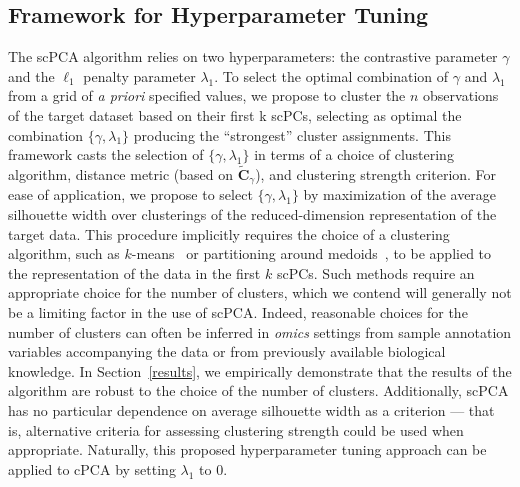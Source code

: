 \subsection{Framework for Hyperparameter Tuning}\label{hyp_tune}

The scPCA algorithm relies on two hyperparameters: the contrastive parameter $\gamma$ and the $\ell_1$ penalty parameter $\lambda_1$. To select the optimal combination of $\gamma$ and $\lambda_1$ from a grid of \textit{a priori} specified values, we propose to cluster the $n$ observations of the target dataset based on their first k scPCs, selecting as optimal the combination $\{\gamma, \lambda_1\}$ producing the ``strongest'' cluster assignments. This framework casts the selection of $\{\gamma, \lambda_1\}$ in terms of a choice of clustering algorithm, distance metric (based on $\widetilde{\mathbf{C}}_{\gamma}$), and clustering strength criterion. For ease of application, we propose to select $\{\gamma, \lambda_1\}$ by maximization of the average silhouette width over clusterings of the reduced-dimension representation of the target data. This procedure implicitly requires the choice of a clustering algorithm, such as $k$-means~\cite{kmeans} or partitioning around medoids~\cite{pam}, to be applied to the representation of the data in the first $k$ scPCs. Such methods require an appropriate choice for the number of clusters, which we contend will generally not be a limiting factor in the use of scPCA. Indeed, reasonable choices for the number of clusters can often be inferred in \textit{omics} settings from sample annotation variables accompanying the data or from previously available biological knowledge. In Section~\ref{results}, we empirically demonstrate that the results of the algorithm are robust to the choice of the number of clusters. Additionally, scPCA has no particular dependence on average silhouette width as a criterion --- that is, alternative criteria for assessing clustering strength could be used when appropriate. %
Naturally, this proposed hyperparameter tuning approach can be applied to cPCA by setting $\lambda_1$ to $0$.

